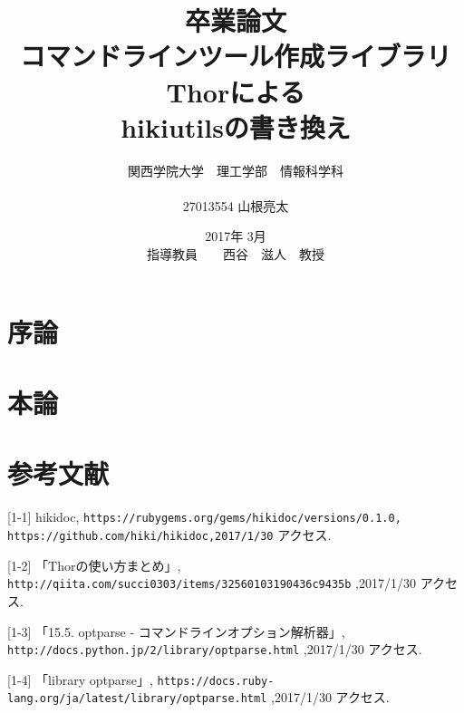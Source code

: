 \documentclass[12pt,a4paper]{jsarticle}
\begin{document}
\title{卒業論文\\
\vspace{4cm} コマンドラインツール作成ライブラリThorによる\\hikiutilsの書き換え}
\author{ 関西学院大学　理工学部　情報科学科\\\\27013554 山根亮太}
\date{\vspace{3cm} 2017年  3月\\
\vspace{3cm} 指導教員　　西谷　滋人　教授}
\maketitle
\setcounter{tocdepth}{4}
\tableofcontents


\abstract{

}
\tableofcontents
\section{序論}


\section{本論}


\section{参考文献}
[1-1] hikidoc, \verb|https://rubygems.org/gems/hikidoc/versions/0.1.0,| \verb|https://github.com/hiki/hikidoc,2017/1/30| アクセス.

[1-2] 「Thorの使い方まとめ」, \verb|http://qiita.com/succi0303/items/32560103190436c9435b| ,2017/1/30 アクセス.

[1-3] 「15.5. optparse - コマンドラインオプション解析器」, \verb|http://docs.python.jp/2/library/optparse.html| ,2017/1/30 アクセス.

[1-4] 「library optparse」, \verb|https://docs.ruby-lang.org/ja/latest/library/optparse.html| ,2017/1/30 アクセス.
\end{document}
